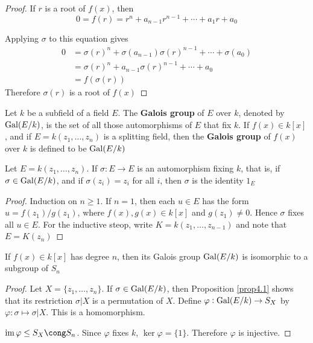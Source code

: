 \documentclass[11pt]{article}
\begin{document}
\begin{proof}
If \(r\) is a root of \(f(x)\), then 
\begin{equation*}
0=f(r)=r^n+a_{n-1}r^{n-1}+\cdots+a_1r+a_0
\end{equation*}

Applying \(\sigma\) to this equation gives
\begin{align*}
0&=\sigma(r)^n+\sigma(a_{n-1})\sigma(r)^{n-1}+\cdots+\sigma(a_0)\\
&=\sigma(r)^n+a_{n-1}\sigma(r)^{n-1}+\cdots+a_0\\
&=f(\sigma(r))
\end{align*}
Therefore \(\sigma(r)\) is a root of \(f(x)\)
\end{proof}

\begin{definition}[]
Let \(k\) be a subfield of a field \(E\). The \textbf{Galois group} of \(E\) over \(k\),
denoted by \(\operatorname{Gal}(E/k)\), is the set of all those automorphisms of \(E\) that
fix \(k\). If \(f(x)\in k[x]\), and if \(E=k(z_1,\dots,z_n)\) is a splitting
field, then the \textbf{Galois group} of \(f(x)\) over \(k\) is defined to be \(\operatorname{Gal}(E/k)\)
\end{definition}

\begin{lemma}[]
\label{lemma4.2}
\label{nlemma3.2}
Let \(E=k(z_1,\dots,z_n)\). If \(\sigma:E\to E\) is an automorphism fixing \(k\),
that is, if \(\sigma\in\operatorname{Gal}(E/k)\), and if \(\sigma(z_i)=z_i\) for all \(i\), then
\(\sigma\) is the identity \(1_E\)
\end{lemma}

\begin{proof}
Induction on \(n\ge1\). If \(n=1\), then each \(u\in E\) has the form 
\(u=f(z_1)/g(z_1)\), where \(f(x),g(x)\in k[x]\) and \(g(z_1)\neq0\). Hence
\(\sigma\) fixes all \(u\in E\). For the inductive steop, write
\(K=k(z_1,\dots,z_{n-1})\) and note that \(E=K(z_n)\)
\end{proof}

\begin{theorem}[]
\label{nthm3.3}
If \(f(x)\in k[x]\) has degree \(n\), then its Galois group \(\operatorname{Gal}(E/k)\) is
isomorphic to a subgroup of \(S_n\)
\end{theorem}

\begin{proof}
Let \(X=\{z_1,\dots,z_n\}\). If \(\sigma\in\operatorname{Gal}(E/k)\), then Proposition
\ref{prop4.1} shows that its restriction \(\sigma|X\) is a permutation of \(X\).
Define \(\varphi:\operatorname{Gal}(E/k)\to S_X\) by \(\varphi:\sigma\mapsto\sigma|X\). This is a
homomorphism.

\(\im\varphi\le S_X\cong S_n\). Since \(\varphi\) fixes \(k\), \(\ker\varphi=\{1\}\).
Therefore \(\varphi\) is injective.
\end{proof}
\end{document}
